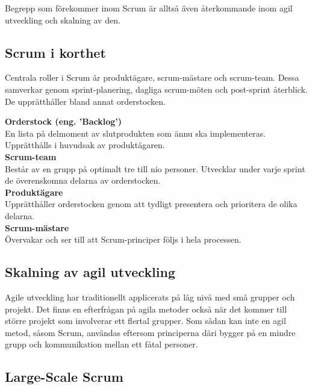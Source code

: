 		Begrepp som förekommer inom Scrum är alltså även återkommande inom agil utveckling och skalning av den.
		
	\subsection{Scrum i korthet}	
		
		Centrala roller i Scrum är produktägare, scrum-mästare och scrum-team. Dessa samverkar genom sprint-planering, dagliga scrum-möten och post-sprint återblick. De upprätthåller bland annat orderstocken.
		
		\textbf{Orderstock (eng. 'Backlog')} \\
		En lista på delmoment av slutprodukten som ännu ska implementeras. Upprätthålls i huvudsak av produktägaren. \\
		
		
		\textbf{Scrum-team} \\
		Består av en grupp på optimalt tre till nio personer. Utvecklar under varje sprint de överenskomna delarna av orderstocken. \\
		
		\textbf{Produktägare} \\
		Upprätthåller orderstocken genom att tydligt presentera och prioritera de olika delarna. \\
		
		\textbf{Scrum-mästare} \\
		Övervakar och ser till att Scrum-principer följs i hela processen. \\
		
		\cite{scrum_guide}
	
		
	
	\subsection{Skalning av agil utveckling}
		
		Agile utveckling har traditionellt applicerats på låg nivå med små grupper och projekt. Det finns en efterfrågan på agila metoder också när det kommer till större projekt som involverar ett flertal grupper. Som sådan kan inte en agil metod, såsom Scrum, användas eftersom principerna däri bygger på en mindre grupp och kommunikation mellan ett fåtal personer.
	
	\subsection{Large-Scale Scrum}
	
